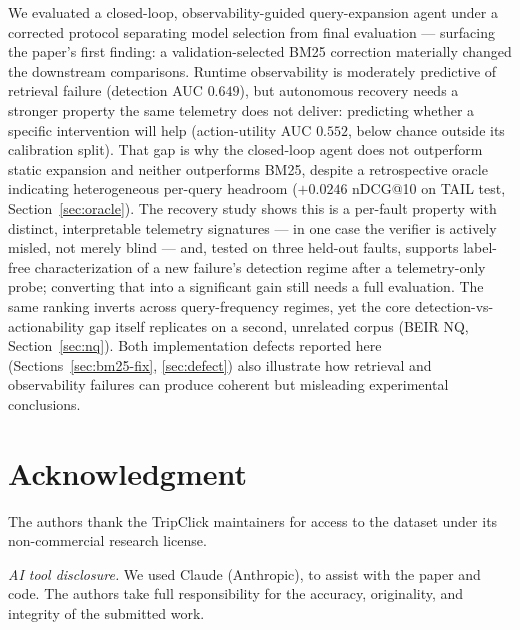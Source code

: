 \documentclass[conference]{IEEEtran}
\begin{document}
We evaluated a closed-loop, observability-guided query-expansion agent
under a corrected protocol separating model selection from final
evaluation --- surfacing the paper's first finding: a
validation-selected BM25 correction materially changed the downstream
comparisons. Runtime observability is moderately predictive of
retrieval failure (detection AUC $0.649$), but autonomous recovery
needs a stronger property the same telemetry does not deliver:
predicting whether a specific intervention will help (action-utility
AUC $0.552$, below chance outside its calibration split). That gap is
why the closed-loop agent does not outperform static expansion and
neither outperforms BM25, despite a retrospective oracle indicating
heterogeneous per-query headroom ($+0.0246$ nDCG@10 on TAIL test,
Section~\ref{sec:oracle}). The
recovery study shows this is a per-fault property with distinct,
interpretable telemetry signatures --- in one case the verifier is actively misled, not merely
blind --- and, tested on three held-out faults, supports label-free
characterization of a new failure's detection regime after a
telemetry-only probe; converting that into a significant gain still needs a full
evaluation. The same ranking inverts across query-frequency regimes,
yet the core detection-vs-actionability gap itself replicates on a
second, unrelated corpus (BEIR NQ, Section~\ref{sec:nq}). Both
implementation defects reported here (Sections~\ref{sec:bm25-fix},
\ref{sec:defect}) also illustrate how retrieval and observability
failures can produce coherent but misleading experimental conclusions.

\section*{Acknowledgment}
The authors thank the TripClick maintainers for access to the dataset
under its non-commercial research license.

\textit{AI tool disclosure.} We used Claude (Anthropic), to assist
with the paper and code. The authors take full responsibility for the
accuracy, originality, and integrity of the submitted work.

\begingroup
\let\oldfootnotesize\footnotesize
\renewcommand{\footnotesize}{\scriptsize}

\let\footnotesize\oldfootnotesize
\endgroup
\end{document}
